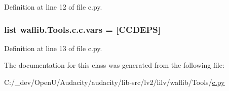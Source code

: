 Definition at line 12 of file c.\+py.

\subsubsection[{\texorpdfstring{vars}{vars}}]{\setlength{\rightskip}{0pt plus 5cm}list waflib.\+Tools.\+c.\+c.\+vars = \mbox{[}\textquotesingle{}C\+C\+D\+E\+PS\textquotesingle{}\mbox{]}\hspace{0.3cm}{\ttfamily [static]}}\hypertarget{classwaflib_1_1_tools_1_1c_1_1c_a76cd04dfeb75c30102069902e33b880c}{}\label{classwaflib_1_1_tools_1_1c_1_1c_a76cd04dfeb75c30102069902e33b880c}


Definition at line 13 of file c.\+py.



The documentation for this class was generated from the following file\+:\begin{DoxyCompactItemize}
\item 
C\+:/\+\_\+dev/\+Open\+U/\+Audacity/audacity/lib-\/src/lv2/lilv/waflib/\+Tools/\hyperlink{lilv_2waflib_2_tools_2c_8py}{c.\+py}\end{DoxyCompactItemize}
